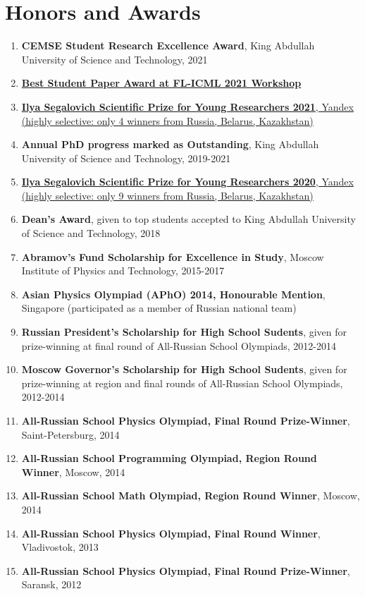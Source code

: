 \section{Honors and Awards}
\hypersetup{colorlinks,breaklinks,urlcolor=black,linkcolor=black}
\begin{enumerate}
	\item  \textbf{CEMSE Student Research Excellence Award}, King Abdullah University of Science and Technology, 2021
	\item \href{http://federated-learning.org/fl-icml-2021/}{\textbf{Best Student Paper Award at FL-ICML 2021 Workshop}}
	\item \href{https://yandex.ru/scholarships/scholars}{\textbf{Ilya Segalovich Scientific Prize for Young Researchers 2021}, Yandex (highly selective: only 4 winners from Russia, Belarus, Kazakhstan)}
	\item {\bf  Annual PhD progress marked as Outstanding}, King Abdullah University of Science and Technology, 2019-2021
	\item \href{https://yandex.ru/scholarships/scholars}{\textbf{Ilya Segalovich Scientific Prize for Young Researchers 2020}, Yandex (highly selective: only 9 winners from Russia, Belarus, Kazakhstan)}
	\item {\bf Dean's Award}, given to top students accepted to King Abdullah University of Science and Technology, 2018
	\item \textbf{Abramov’s Fund Scholarship for Excellence in Study}, Moscow Institute of Physics and Technology, 2015-2017
	\item \textbf{Asian Physics Olympiad (APhO) 2014, Honourable Mention}, Singapore (participated as a member of Russian national team)
	
	\item \textbf{Russian President’s Scholarship for High School Sudents}, given for prize-winning at final round of All-Russian School Olympiads, 2012-2014
	\item \textbf{Moscow Governor’s Scholarship for High School Sudents}, given for prize-winning at region and final rounds of All-Russian School Olympiads, 2012-2014
	
	\item \textbf{All-Russian School Physics Olympiad, Final Round Prize-Winner}, Saint-Petersburg, 2014
	\item \textbf{All-Russian School Programming Olympiad, Region Round Winner}, Moscow, 2014
	\item \textbf{All-Russian School Math Olympiad, Region Round Winner}, Moscow, 2014
	
	\item \textbf{All-Russian School Physics Olympiad, Final Round Winner}, Vladivostok, 2013
	\item \textbf{All-Russian School Physics Olympiad, Final Round Prize-Winner}, Saransk, 2012
\end{enumerate}
